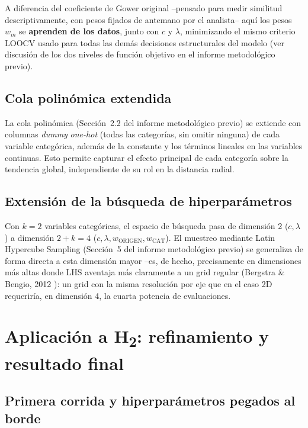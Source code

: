 \documentclass[11pt,a4paper]{article}
\begin{document}
A diferencia del coeficiente de Gower original --pensado para medir
similitud descriptivamente, con pesos fijados de antemano por el analista--
aqu\'i los pesos $w_m$ se \textbf{aprenden de los datos}, junto con $c$ y
$\lambda$, minimizando el mismo criterio LOOCV usado para todas las dem\'as
decisiones estructurales del modelo (ver discusi\'on de los dos niveles de
funci\'on objetivo en el informe metodol\'ogico previo).

\subsection{Cola polin\'omica extendida}

La cola polin\'omica (Secci\'on~2.2 del informe metodol\'ogico previo) se
extiende con columnas \emph{dummy} \emph{one-hot} (todas las categor\'ias,
sin omitir ninguna) de cada variable categ\'orica, adem\'as de la constante y
los t\'erminos lineales en las variables continuas. Esto permite capturar el
efecto principal de cada categor\'ia sobre la tendencia global, independiente
de su rol en la distancia radial.

\subsection{Extensi\'on de la b\'usqueda de hiperpar\'ametros}

Con $k=2$ variables categ\'oricas, el espacio de b\'usqueda pasa de dimensi\'on
2 ($c,\lambda$) a dimensi\'on $2+k=4$ ($c,\lambda,w_{\text{ORIGEN}},w_{\text{CAT}}$).
El muestreo mediante Latin Hypercube Sampling (Secci\'on~5 del informe
metodol\'ogico previo) se generaliza de forma directa a esta dimensi\'on
mayor --es, de hecho, precisamente en dimensiones m\'as altas donde LHS
aventaja m\'as claramente a un grid regular (Bergstra \& Bengio, 2012
\cite{bergstra2012}): un grid con la misma resoluci\'on por eje que en el
caso 2D requerir\'ia, en dimensi\'on 4, la cuarta potencia de evaluaciones.

\section{Aplicaci\'on a H\textsubscript{2}: refinamiento y resultado final}
\label{sec:h2}

\subsection{Primera corrida y hiperpar\'ametros pegados al borde}
\end{document}
